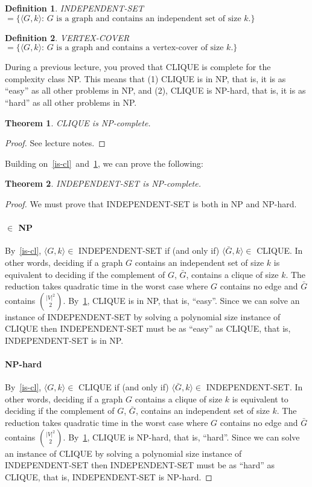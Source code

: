 \documentclass{article}
\newcommand{\theoremname}{Theorem}
\newcommand{\definitionname}{Definition}
\newtheorem{theorem}{\theoremname}
\newtheorem{definition}{\definitionname}
\newcommand{\card}[1]{|#1|}
\newcommand{\st}{\colon\,}
\begin{document}
\begin{definition}
  INDEPENDENT-SET $= \{\langle G,k \rangle \st \text{$G$ is a graph and contains an independent set of size $k$.} \}$
\end{definition}

\begin{definition}
  VERTEX-COVER $= \{\langle G,k \rangle \st \text{$G$ is a graph and contains a vertex-cover of size $k$.} \}$
\end{definition}

During a previous lecture, you proved that CLIQUE is complete for the
complexity class NP. This means that (1) CLIQUE is in NP, that is, it is as
``easy'' as all other problems in NP, and (2), CLIQUE is NP-hard,
that is, it is as ``hard'' as all other problems in NP.
\begin{theorem}\label{cl:npc}
CLIQUE is NP-complete.
\end{theorem}
\begin{proof}
  See lecture notes.
\end{proof}

Building on~\ref{is-cl}~and~\ref{cl:npc}, we can prove the following:
\begin{theorem}\label{is:npc}
INDEPENDENT-SET is NP-complete.
\end{theorem}

\begin{proof}
  We must prove that INDEPENDENT-SET is both in NP and NP-hard.
  \paragraph{$\in$ NP}
  By~\ref{is-cl}, $\langle G,k \rangle \in$ INDEPENDENT-SET if (and only if)
  $\langle \bar{G},k\rangle \in$ CLIQUE.
  In other words, deciding if a graph $G$ contains an independent set of size $k$ is
  equivalent to deciding if the complement of $G$, $\bar{G}$, contains a
  clique of size $k$. The reduction takes quadratic time in the worst
  case where $G$ contains no edge and $\bar{G}$ contains $\binom{\card{V}^2}{2}$.
  By~\ref{cl:npc}, CLIQUE is in NP, that is, ``easy''. Since
  we can solve an instance of INDEPENDENT-SET by solving a polynomial size instance of
  CLIQUE then INDEPENDENT-SET must be as ``easy'' as CLIQUE, that
  is, INDEPENDENT-SET is in NP.

  \paragraph{NP-hard}
  By~\ref{is-cl}, $\langle G,k \rangle \in$ CLIQUE if (and only if)
  $\langle \bar{G},k\rangle \in$ INDEPENDENT-SET.
  In other words, deciding if a graph $G$ contains a clique of size $k$ is
  equivalent to deciding if the complement of $G$, $\bar{G}$, contains an
  independent set of size $k$. The reduction takes quadratic time in the worst
  case where $G$ contains no edge and $\bar{G}$ contains $\binom{\card{V}^2}{2}$.
  By~\ref{cl:npc}, CLIQUE is NP-hard, that is, ``hard''. Since
  we can solve an instance of CLIQUE by solving a polynomial size instance of
  INDEPENDENT-SET then INDEPENDENT-SET must be as ``hard'' as CLIQUE, that
  is, INDEPENDENT-SET is NP-hard.
\end{proof}
\end{document}
